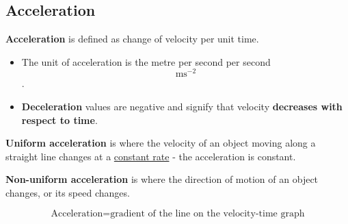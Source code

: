 \subsection{Acceleration}

\textbf{Acceleration} is defined as change of velocity per unit time.
\begin{itemize}
    \item The unit of acceleration is the metre per second per second $$\text{ms}^{-2}$$.
    \item \textbf{Deceleration} values are negative and signify that velocity \textbf{decreases with respect to time}.
\end{itemize}

\textbf{Uniform acceleration} is where the velocity of an object moving along a straight line changes at a \underline{constant rate} - the acceleration is constant.

\textbf{Non-uniform acceleration} is where the direction of motion of an object changes, or its speed changes.

$$\text{Acceleration}=\text{gradient of the line on the velocity-time graph}$$
